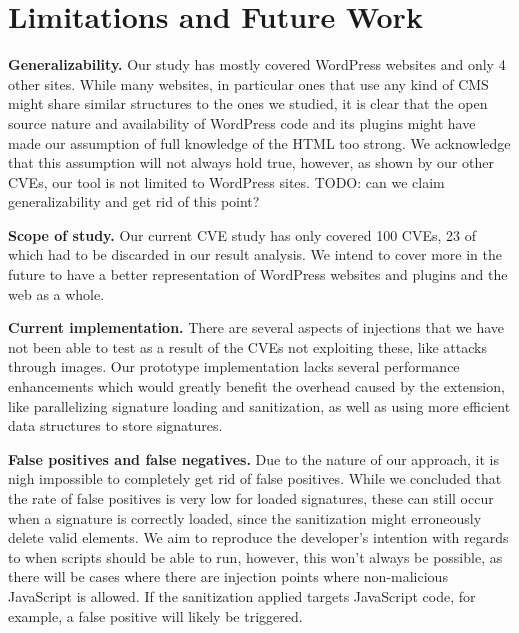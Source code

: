 \section{Limitations and Future Work}
\textbf{Generalizability.} Our study has mostly covered WordPress websites and only 4 other sites. While many websites, in particular ones that use any kind of CMS might share similar structures to the ones we studied, it is clear that the open source nature and availability of WordPress code and its plugins might have made our assumption of full knowledge of the HTML too strong. We acknowledge that this assumption will not always hold true, however, as shown by our other CVEs, our tool is not limited to WordPress sites. TODO: can we claim generalizability and get rid of this point?

\textbf{Scope of study.} Our current CVE study has only covered 100 CVEs, 23 of which had to be discarded in our result analysis. We intend to cover more in the future to have a better representation of WordPress websites and plugins and the web as a whole. 

\textbf{Current implementation.} There are several aspects of injections that we have not been able to test as a result of the CVEs not exploiting these, like attacks through images. Our prototype implementation lacks several performance enhancements which would greatly benefit the overhead caused by the extension, like parallelizing signature loading and sanitization, as well as using more efficient data structures to store signatures. 

\textbf{False positives and false negatives.} Due to the nature of our approach, it is nigh impossible to completely get rid of false positives. While we concluded that the rate of false positives is very low for loaded signatures, these can still occur when a signature is correctly loaded, since the sanitization might erroneously delete valid elements. We aim to reproduce the developer's intention with regards to when scripts should be able to run, however, this won't always be possible, as there will be cases where there are injection points where non-malicious JavaScript is allowed. If the sanitization applied targets JavaScript code, for example, a false positive will likely be triggered.

